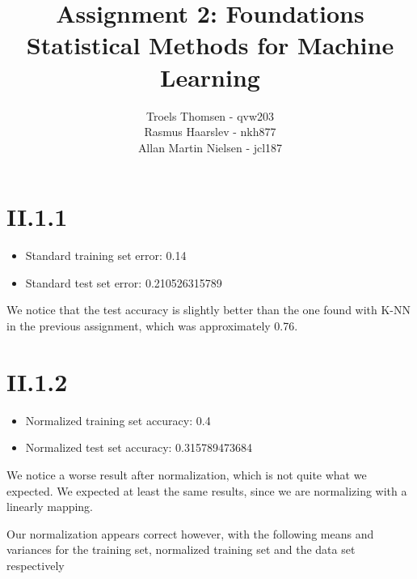 \documentclass[12pt, a4paper]{article}
\title{Assignment 2: Foundations\\Statistical Methods for Machine Learning}
\author{Troels Thomsen - qvw203\\Rasmus Haarslev - nkh877\\Allan Martin Nielsen - jcl187}
\begin{document}
\pagestyle{empty}
\maketitle
{}
\newpage

\tableofcontents
\newpage

\pagestyle{fancy}

\section{II.1.1}
\begin{itemize}
	\item Standard training set error: 0.14
	\item Standard test set error: 0.210526315789
\end{itemize}

We notice that the test accuracy is slightly better than the one found with K-NN in the previous assignment, which was approximately 0.76.

\section{II.1.2}
\begin{itemize}
	\item Normalized training set accuracy: 0.4
	\item Normalized test set accuracy: 0.315789473684
\end{itemize}

We notice a worse result after normalization, which is not quite what we expected. We expected at least the same results, since we are normalizing with a linearly mapping.

Our normalization appears correct however, with the following means and variances for the training set, normalized training set and the data set respectively
\end{document}
